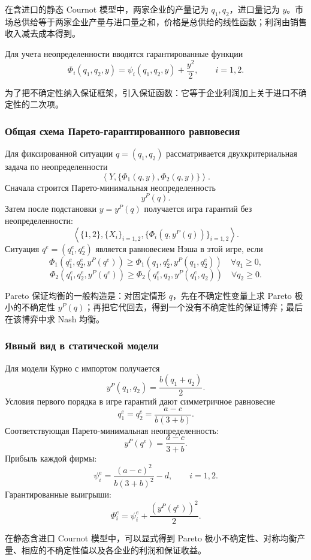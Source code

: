 \documentclass[12pt,a4paper]{article}
\newcommand{\zh}[1]{\par\noindent #1\par}
\begin{document}
\zh{在含进口的静态 Cournot 模型中，两家企业的产量记为 $q_1,q_2$，进口量记为 $y$。市场总供给等于两家企业产量与进口量之和，价格是总供给的线性函数；利润由销售收入减去成本得到。}

Для учета неопределенности вводятся гарантированные функции
\[
\Phi_i(q_1,q_2,y)=\psi_i(q_1,q_2,y)+\frac{y^2}{2},
\qquad i=1,2.
\]

\zh{为了把不确定性纳入保证框架，引入保证函数：它等于企业利润加上关于进口不确定性的二次项。}

\subsubsection{Общая схема Парето-гарантированного равновесия}
Для фиксированной ситуации $q=(q_1,q_2)$ рассматривается двухкритериальная задача по неопределенности
\[
\left\langle Y,\{\Phi_1(q,y),\Phi_2(q,y)\}\right\rangle.
\]
Сначала строится Парето-минимальная неопределенность
\[
y^P(q).
\]
Затем после подстановки $y=y^P(q)$ получается игра гарантий без неопределенности:
\[
\left\langle \{1,2\},\{X_i\}_{i=1,2},\{\Phi_i(q,y^P(q))\}_{i=1,2}\right\rangle.
\]
Ситуация $q^e=(q_1^e,q_2^e)$ является равновесием Нэша в этой игре, если
\[
\Phi_1(q_1^e,q_2^e,y^P(q^e))\ge
\Phi_1(q_1,q_2^e,y^P(q_1,q_2^e))\quad \forall q_1\ge 0,
\]
\[
\Phi_2(q_1^e,q_2^e,y^P(q^e))\ge
\Phi_2(q_1^e,q_2,y^P(q_1^e,q_2))\quad \forall q_2\ge 0.
\]

\zh{Pareto 保证均衡的一般构造是：对固定情形 $q$，先在不确定性变量上求 Pareto 极小的不确定性 $y^P(q)$；再把它代回去，得到一个没有不确定性的保证博弈；最后在该博弈中求 Nash 均衡。}

\subsubsection{Явный вид в статической модели}
Для модели Курно с импортом получается
\[
y^P(q_1,q_2)=\frac{b(q_1+q_2)}{2}.
\]
Условия первого порядка в игре гарантий дают симметричное равновесие
\[
q_1^e=q_2^e=\frac{a-c}{b(3+b)}.
\]
Соответствующая Парето-минимальная неопределенность:
\[
y^P(q^e)=\frac{a-c}{3+b}.
\]
Прибыль каждой фирмы:
\[
\psi_i^e=\frac{(a-c)^2}{b(3+b)^2}-d,
\qquad i=1,2.
\]
Гарантированные выигрыши:
\[
\Phi_i^e=\psi_i^e+\frac{(y^P(q^e))^2}{2}.
\]

\zh{在静态含进口 Cournot 模型中，可以显式得到 Pareto 极小不确定性、对称均衡产量、相应的不确定性值以及各企业的利润和保证收益。}

\end{document}
